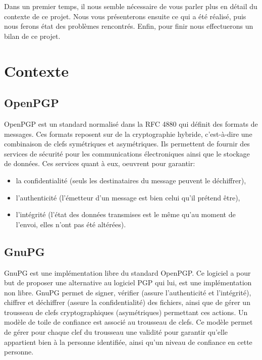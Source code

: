 \documentclass{../res/univ-projet}
\begin{document}
Dans un premier temps, il nous semble nécessaire de vous parler plus en 
détail du contexte de ce projet. Nous vous présenterons ensuite ce qui a été 
réalisé, puis nous ferons état des problèmes rencontrés. Enfin, pour finir 
nous effectuerons un bilan de ce projet.

\section{Contexte}
  \subsection{OpenPGP}
    OpenPGP est un standard normalisé dans la RFC 4880 qui définit des 
    formats de messages. Ces formats reposent sur de la cryptographie hybride, 
    c'est-à-dire une combinaison de clefs symétriques et asymétriques. Ils 
    permettent de fournir des services de sécurité pour les communications 
    électroniques ainsi que le stockage de données. Ces services quant à eux,
    oeuvrent pour garantir:
    \begin{itemize}
     \item la confidentialité (seuls les destinataires du message 
	   peuvent le déchiffrer),
     \item l'authenticité (l'émetteur d'un message est bien celui qu'il 
	   prétend être),
     \item l'intégrité (l'état des données transmises est le même qu'au 
	   moment de l'envoi, elles n'ont pas été altérées).
    \end{itemize}
 
  \subsection{GnuPG}
    GnuPG est une implémentation libre du standard OpenPGP. Ce logiciel a 
    pour but de proposer une alternative au logiciel PGP qui lui, est une
    implémentation non libre. 
    GnuPG permet de signer, vérifier (assure l'authenticité et l'intégrité), 
    chiffrer et déchiffrer (assure la confidentialité) des fichiers, ainsi 
    que de gérer un trousseau de clefs cryptographiques (asymétriques) 
    permettant ces actions. 
    Un modèle de toile de confiance est associé au trousseau de clefs. 
    Ce modèle permet de gérer pour chaque clef du trousseau une 
    validité pour garantir qu'elle appartient bien à la personne 
    identifiée, ainsi qu'un niveau de confiance en cette personne.
    
\end{document}
